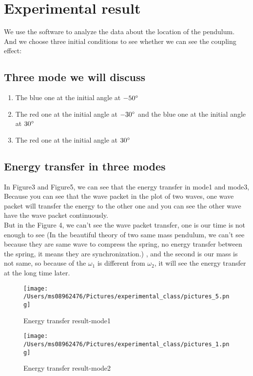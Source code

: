 \documentclass[final,1p,11pt]{elsarticle}
\begin{document}
\section{Experimental result}
We use the software to analyze the data about the location of the pendulum.\\
And we choose three initial conditions to see whether we can see the coupling effect:\\
\subsection{Three mode we will discuss}
\begin{enumerate}
\item The blue one at the initial angle at $-50\degree$
\item The red one at the initial angle at $-30\degree$ and the blue one at the initial angle at $30\degree$
\item The red one at the initial angle at $30\degree$
\end{enumerate} 

\subsection{Energy transfer in three modes}
In Figure3 and Figure5, we can see that the energy transfer in mode1 and mode3, Because you can see that the wave packet in the plot of two waves, one wave packet will transfer the energy to the other one and you can see the other wave have the wave packet continuously.\\

But in the Figure 4, we can't see the wave packet transfer,  one is our time is not enough to see (In the beautiful theory of two same mass pendulum, we can't see because they are same wave to compress the spring, no energy transfer between the spring, it means they are synchronization.) , and the second is our mass is not same, so because of the $\omega_1$ is different from $\omega_2$, it will see the energy transfer at the long time later.
\begin{figure}
\caption{Energy transfer result-mode1}
\centering
\texttt{[image: /Users/ms08962476/Pictures/experimental\_class/pictures\_5.png]}
\end{figure} 

\begin{figure}
\caption{Energy transfer result-mode2}
\centering
\texttt{[image: /Users/ms08962476/Pictures/experimental\_class/pictures\_1.png]}
\end{figure} 
\end{document}
